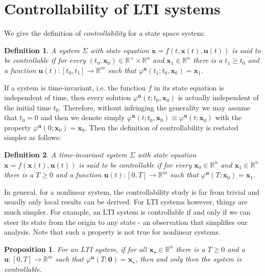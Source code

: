 \documentclass[a4paper,10pt,oneside]{book}
\newtheorem{definition}{Definition}
\newtheorem{proposition}[theorem]{Proposition}
\begin{document}
\section{Controllability of LTI systems}
We give the definition of \emph{controllability} for a state space system:
\begin{definition}
 A system $\Sigma$ with state equation $\dot{\mathbf{x}}=f(t,\mathbf{x}(t),\mathbf{u}(t))$ is said to be controllable if for every $(t_0,\mathbf{x}_0)\in\mathbb{R}^+\times\mathbb{R}^n$ and $\mathbf{x}_1\in\mathbb{R}^n$ there is a $t_1\geq t_0$ and a function $\mathbf{u}(t):[t_0,t_1]\to \mathbb{R}^m$ such that $\varphi^{\mathbf{u}}(t_1;t_0,\mathbf{x}_0)=\mathbf{x}_1$.
\end{definition}
If a system is time-invariant, i.e. the function $f$ in its state equation is independent of time, then every solution $\varphi^{\mathbf{u}}(t;t_0,\mathbf{x}_0)$ is actually independent of the initial time $t_0$. Therefore, without infringing the generality we may assume that $t_0=0$ and then we denote simply $\varphi^{\mathbf{u}}(t;t_0,\mathbf{x}_0)\equiv\varphi^{\mathbf{u}}(t;\mathbf{x}_0)$ with the property $\varphi^{\mathbf{u}}(0;\mathbf{x}_0)=\mathbf{x}_0$. Then the definition of controllability is restated simpler as follows:
\begin{definition}
 A time-invariant system $\Sigma$ with state equation $\dot{\mathbf{x}}=f(\mathbf{x}(t),\mathbf{u}(t))$ is said to be controllable if for every $\mathbf{x}_0\in\mathbb{R}^n$ and $\mathbf{x}_1\in\mathbb{R}^n$ there is a $T\geq 0$ and a function $\mathbf{u}(t):[0,T]\to \mathbb{R}^m$ such that $\varphi^{\mathbf{u}}(T;\mathbf{x}_0)=\mathbf{x}_1$.
\end{definition} 
In general, for a nonlinear system, the controllability study is far from trivial and usually only local results can be derived. For LTI systems however, things are much simpler. For example, an LTI system is controllable if and only if we can steer its state from the origin to any state - an observation that simplifies our analysis. Note that such a property is not true for nonlinear systems.
\begin{proposition}\label{controllabilityCondition1}
 For an LTI system, if for all $\mathbf{x}_\star\in\mathbb{R}^n$ there is a $T\geq 0$ and a $\mathbf{u}:[0,T]\to \mathbb{R}^m$ such that $\varphi^{\mathbf{u}}(T;\mathbf{0})=\mathbf{x}_\star$, then and only then the system is controllable. 
\end{proposition}
\end{document}

